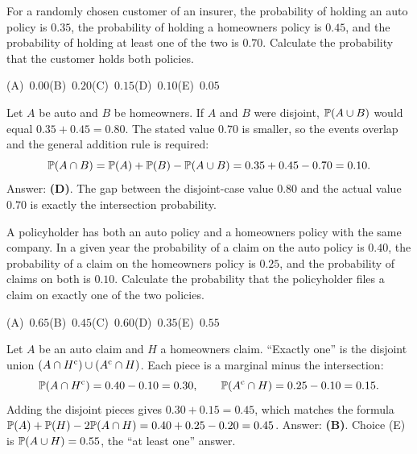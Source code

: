 \begin{example}
For a randomly chosen customer of an insurer, the probability of holding an auto policy is
$0.35$, the probability of holding a homeowners policy is $0.45$, and the probability of
holding at least one of the two is $0.70$. Calculate the probability that the customer holds
both policies.

\smallskip\noindent (A)~$0.00$\hfill (B)~$0.20$\hfill (C)~$0.15$\hfill (D)~$0.10$\hfill (E)~$0.05$\hfill\mbox{}
\end{example}
\begin{solution}
Let $A$ be auto and $B$ be homeowners. If $A$ and $B$ were disjoint, $\mathbb{P}(A \cup B)$ would
equal $0.35 + 0.45 = 0.80$. The stated value $0.70$ is smaller, so the events overlap and
the general addition rule is required:
\[
\mathbb{P}(A \cap B) = \mathbb{P}(A) + \mathbb{P}(B) - \mathbb{P}(A \cup B) = 0.35 + 0.45 - 0.70 = 0.10.
\]
Answer: \textbf{(D)}. The gap between the disjoint-case value $0.80$ and the actual value
$0.70$ is exactly the intersection probability.
\end{solution}

\begin{example}
A policyholder has both an auto policy and a homeowners policy with the same company. In a
given year the probability of a claim on the auto policy is $0.40$, the probability of a claim
on the homeowners policy is $0.25$, and the probability of claims on both is $0.10$.
Calculate the probability that the policyholder files a claim on exactly one of the two
policies.

\smallskip\noindent (A)~$0.65$\hfill (B)~$0.45$\hfill (C)~$0.60$\hfill (D)~$0.35$\hfill (E)~$0.55$\hfill\mbox{}
\end{example}
\begin{solution}
Let $A$ be an auto claim and $H$ a homeowners claim. ``Exactly one'' is the disjoint union
$(A \cap H^{\mathrm{c}}) \cup (A^{\mathrm{c}} \cap H)$. Each piece is a marginal minus the intersection:
\[
\mathbb{P}(A \cap H^{\mathrm{c}}) = 0.40 - 0.10 = 0.30, \qquad
\mathbb{P}(A^{\mathrm{c}} \cap H) = 0.25 - 0.10 = 0.15.
\]
Adding the disjoint pieces gives $0.30 + 0.15 = 0.45$, which matches the formula
$\mathbb{P}(A) + \mathbb{P}(H) - 2\mathbb{P}(A \cap H) = 0.40 + 0.25 - 0.20 = 0.45$.
Answer: \textbf{(B)}. Choice (E) is $\mathbb{P}(A \cup H) = 0.55$, the ``at least one'' answer.
\end{solution}

